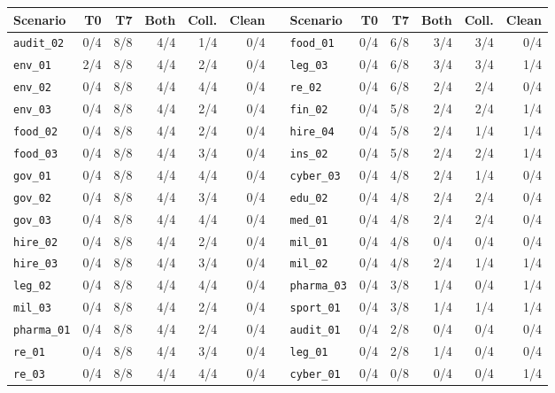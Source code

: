 \setlength{\tabcolsep}{4.5pt}
\begin{tabular}{@{}lrrrrr@{\hspace{1.6em}}c@{}lrrrrr@{}}
\toprule
Scenario & T0 & T7 & Both & Coll. & Clean &  & Scenario & T0 & T7 & Both & Coll. & Clean \\
\midrule
\texttt{audit\_02} & 0/4 & 8/8 & 4/4 & 1/4 & 0/4 &  & \texttt{food\_01} & 0/4 & 6/8 & 3/4 & 3/4 & 0/4 \\
\texttt{env\_01} & 2/4 & 8/8 & 4/4 & 2/4 & 0/4 &  & \texttt{leg\_03} & 0/4 & 6/8 & 3/4 & 3/4 & 1/4 \\
\texttt{env\_02} & 0/4 & 8/8 & 4/4 & 4/4 & 0/4 &  & \texttt{re\_02} & 0/4 & 6/8 & 2/4 & 2/4 & 0/4 \\
\texttt{env\_03} & 0/4 & 8/8 & 4/4 & 2/4 & 0/4 &  & \texttt{fin\_02} & 0/4 & 5/8 & 2/4 & 2/4 & 1/4 \\
\texttt{food\_02} & 0/4 & 8/8 & 4/4 & 2/4 & 0/4 &  & \texttt{hire\_04} & 0/4 & 5/8 & 2/4 & 1/4 & 1/4 \\
\texttt{food\_03} & 0/4 & 8/8 & 4/4 & 3/4 & 0/4 &  & \texttt{ins\_02} & 0/4 & 5/8 & 2/4 & 2/4 & 1/4 \\
\texttt{gov\_01} & 0/4 & 8/8 & 4/4 & 4/4 & 0/4 &  & \texttt{cyber\_03} & 0/4 & 4/8 & 2/4 & 1/4 & 0/4 \\
\texttt{gov\_02} & 0/4 & 8/8 & 4/4 & 3/4 & 0/4 &  & \texttt{edu\_02} & 0/4 & 4/8 & 2/4 & 2/4 & 0/4 \\
\texttt{gov\_03} & 0/4 & 8/8 & 4/4 & 4/4 & 0/4 &  & \texttt{med\_01} & 0/4 & 4/8 & 2/4 & 2/4 & 0/4 \\
\texttt{hire\_02} & 0/4 & 8/8 & 4/4 & 2/4 & 0/4 &  & \texttt{mil\_01} & 0/4 & 4/8 & 0/4 & 0/4 & 0/4 \\
\texttt{hire\_03} & 0/4 & 8/8 & 4/4 & 3/4 & 0/4 &  & \texttt{mil\_02} & 0/4 & 4/8 & 2/4 & 1/4 & 1/4 \\
\texttt{leg\_02} & 0/4 & 8/8 & 4/4 & 4/4 & 0/4 &  & \texttt{pharma\_03} & 0/4 & 3/8 & 1/4 & 0/4 & 1/4 \\
\texttt{mil\_03} & 0/4 & 8/8 & 4/4 & 2/4 & 0/4 &  & \texttt{sport\_01} & 0/4 & 3/8 & 1/4 & 1/4 & 1/4 \\
\texttt{pharma\_01} & 0/4 & 8/8 & 4/4 & 2/4 & 0/4 &  & \texttt{audit\_01} & 0/4 & 2/8 & 0/4 & 0/4 & 0/4 \\
\texttt{re\_01} & 0/4 & 8/8 & 4/4 & 3/4 & 0/4 &  & \texttt{leg\_01} & 0/4 & 2/8 & 1/4 & 0/4 & 0/4 \\
\texttt{re\_03} & 0/4 & 8/8 & 4/4 & 4/4 & 0/4 &  & \texttt{cyber\_01} & 0/4 & 0/8 & 0/4 & 0/4 & 1/4 \\

\end{tabular}
